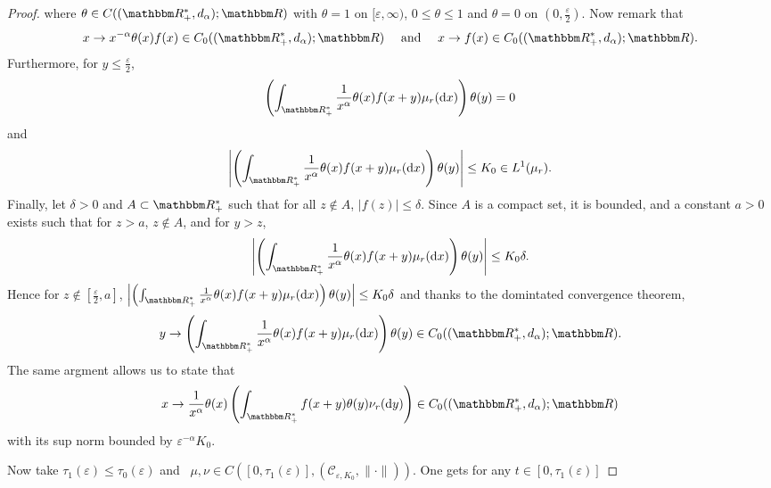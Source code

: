 \documentclass[a4paper,11pt, reqno]{amsart}
\newcommand{\cC}{\mathcal{C}}	\newcommand{\CC}{\mathbbm{C}}
\newcommand{\eps}{\varepsilon}
\newcommand{\dd}{\mathop{}\!\mathrm{d}}
\newcommand{\1}{\mathbbm{1}}
\theoremstyle{plain}
\theoremstyle{definition}
\begin{document}
\begin{proof}
  where $\theta \in C ((\RR^{\ast}_+, d_{\alpha}) ; \RR)$ with
  $\theta = 1$ on $[\eps, \infty)$, $0 \le \theta \le 1$
  and $\theta = 0$ on $\left( 0, \frac{\eps}{2} \right)$. Now remark
  that
  \[ x \rightarrow x^{- \alpha} \theta (x) f (x) \in C_0
     ((\RR_+^{\ast}, d_{\alpha}) ; \RR) \quad  \text{ and } \quad x
     \rightarrow f (x) \in C_0 ((\RR_+^{\ast}, d_{\alpha}) ;
     \RR) . \]
  Furthermore, for $y \le \frac{\eps}{2}$,
  \[ \left( \int_{\RR^{\ast}_+} \frac{1}{x^{\alpha}} \theta (x) f (x +
     y) \mu_r (\dd x) \right) \theta (y) = 0 \]
  and
  \[ \left| \left( \int_{\RR^{\ast}_+} \frac{1}{x^{\alpha}} \theta (x)
     f (x + y) \mu_r (\dd x) \right) \theta (y) \right| \le K_0 \in
     L^1 (\mu_r) . \]
  Finally, let $\delta > 0$ and $A \subset \RR_+^{\ast}$ such that for
  all $z \notin A$, $| f (z) | \le \delta$. Since $A$ is a compact set,
  it is bounded, and a constant $a > 0$ exists such that for $z > a$, $z
  \notin A$, and for $y > z$,
  \[ \left| \left( \int_{\RR^{\ast}_+} \frac{1}{x^{\alpha}} \theta (x)
     f (x + y) \mu_r (\dd x) \right) \theta (y) \right| \le K_0
     \delta . \]
  Hence for $z \notin \left[ \frac{\eps}{2}, a \right]$, $\left| \left(
  \int_{\RR^{\ast}_+} \frac{1}{x^{\alpha}} \theta (x) f (x + y) \mu_r
  (\dd x) \right) \theta (y) \right| \le K_0 \delta$ and thanks to
  the domintated convergence theorem,
  \[ y \rightarrow \left( \int_{\RR^{\ast}_+} \frac{1}{x^{\alpha}}
     \theta (x) f (x + y) \mu_r (\dd x) \right) \theta (y) \in C_0
     ((\RR_+^{\ast}, d_{\alpha}) ; \RR) . \]
  The same argment allows us to state that
  \[ x \rightarrow \frac{1}{x^{\alpha}} \theta (x) \left(
     \int_{\RR^{\ast}_+} f (x + y) \theta (y) \nu_r (\dd y) \right)
     \in C_0 ((\RR_+^{\ast}, d_{\alpha}) ; \RR) \]
  with its sup norm bounded by $\eps^{- \alpha} K_0$.
  
  Now take $\tau_1 (\eps) \le \tau_0 (\eps)$ and \ $\mu,
  \nu \in C ([0, \tau_1 (\eps)], (\cC_{\eps, K_0}, \|
  \cdot \|))$. One gets for any $t \in [0, \tau_1 (\eps)]$
  

\end{proof}
\end{document}
